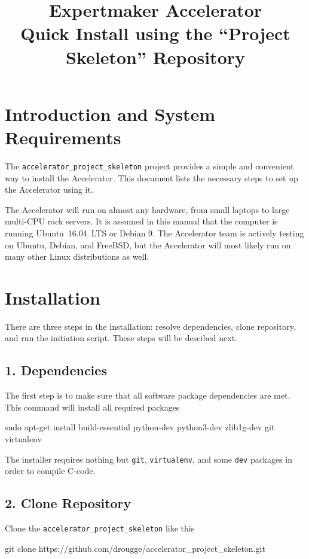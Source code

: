 \documentclass[a4paper]{article}
\title{\vspace{-20mm}Expertmaker Accelerator\\[1ex]\Large{Quick Install using the ``Project Skeleton'' Repository}}
\date{}
\begin{document}
\maketitle

\section*{Introduction and System Requirements}
The \texttt{accelerator\_project\_skeleton} project provides a simple
and convenient way to install the Accelerator.  This document lists
the necessary steps to set up the Accelerator using it.

The Accelerator will run on almost any hardware, from small laptops to
large multi-CPU rack servers.  It is assumed in this manual that the
computer is running Ubuntu~16.04~LTS or Debian 9.  The Accelerator
team is actively testing on Ubuntu, Debian, and FreeBSD, but the
Accelerator will most likely run on many other Linux distributions as well.


\section*{Installation}
There are three steps in the installation: resolve dependencies, clone
repository, and run the initiation script.  These steps will be
descibed next.
\subsection*{1. Dependencies}
The first step is to make sure that all software package dependencies
are met.  This command will install all required packages
\begin{shell}
sudo apt-get install build-essential python-dev python3-dev zlib1g-dev git virtualenv
\end{shell}
The installer requires nothing but \texttt{git}, \texttt{virtualenv},
and some \texttt{dev} packages in order to compile C-code.

\subsection*{2. Clone Repository}
Clone the \texttt{accelerator\_project\_skeleton} like this
\begin{shell}
git clone https://github.com/drougge/accelerator_project_skeleton.git
\end{shell}
\end{document}
